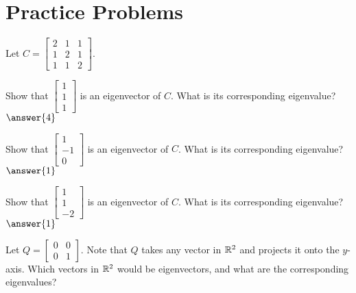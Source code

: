 \documentclass{ximera}
\begin{document}
\section*{Practice Problems}
    
Let $C=\begin{bmatrix} 2 & 1 & 1\\ 1 & 2 & 1\\ 1 & 1 & 2\end{bmatrix}$. 
    
\begin{problem}\label{prob:checkeig1}
Show that $\begin{bmatrix} 1\\1\\1 \end{bmatrix}$ is an eigenvector of $C$.  What is its corresponding eigenvalue?
$\answer{4}$
\end{problem}
    
    \begin{problem}\label{prob:checkeig2}
Show that $\begin{bmatrix} 1\\-1\\0 \end{bmatrix}$ is an eigenvector of $C$.  What is its corresponding eigenvalue?
$\answer{1}$
\end{problem}
    
    \begin{problem}\label{prob:checkeig3}
Show that $\begin{bmatrix} 1\\1\\-2 \end{bmatrix}$ is an eigenvector of $C$.  What is its corresponding eigenvalue?
$\answer{1}$
\end{problem}
    
    
\begin{problem}\label{prob:eigprojmatrix}
Let $Q=\begin{bmatrix} 0& 0\\ 0&1\end{bmatrix}$.  Note that $Q$ takes any vector in $\mathbb{R}^2$ and projects it onto the $y$-axis.  Which vectors in $\mathbb{R}^2$ would be eigenvectors, and what are the corresponding eigenvalues?
\end{problem}
    
\end{document}
